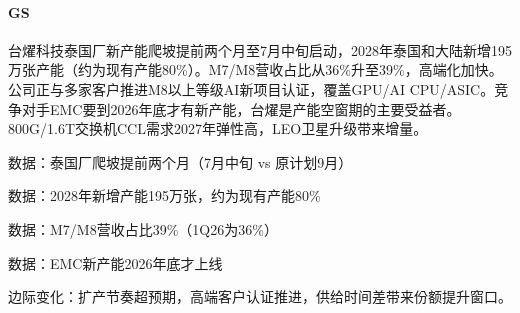 \documentclass[11pt]{ctexart}
\begin{document}
\paragraph{GS} 台燿科技泰国厂新产能爬坡提前两个月至7月中旬启动，2028年泰国和大陆新增195万张产能（约为现有产能80\%）。M7/M8营收占比从36\%升至39\%，高端化加快。公司正与多家客户推进M8以上等级AI新项目认证，覆盖GPU/AI CPU/ASIC。竞争对手EMC要到2026年底才有新产能，台燿是产能空窗期的主要受益者。800G/1.6T交换机CCL需求2027年弹性高，LEO卫星升级带来增量。
{\small\color{refgray}数据：泰国厂爬坡提前两个月（7月中旬 vs 原计划9月）\par}
{\small\color{refgray}数据：2028年新增产能195万张，约为现有产能80\%\par}
{\small\color{refgray}数据：M7/M8营收占比39\%（1Q26为36\%）\par}
{\small\color{refgray}数据：EMC新产能2026年底才上线\par}
{\small\color{refgray}边际变化：扩产节奏超预期，高端客户认证推进，供给时间差带来份额提升窗口。\par}
\end{document}
